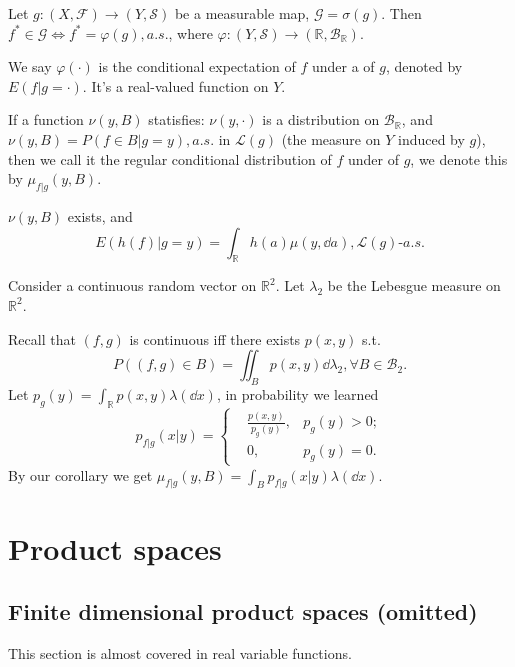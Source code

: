 Let $g:(X, \mathscr{F}) \to (Y, \mathscr{S})$ be a measurable map,
$\mathscr{G} = \sigma(g)$.
Then $f^*\in \mathscr{G} \iff f^* = \varphi(g), a.s.$,
where $\varphi:(Y, \mathscr{S}) \to (\mathbb{R}, \mathscr{B}_{\mathbb{R}})$.

\begin{definition}
	We say $\varphi(\cdot)$ is the conditional expectation of $f$ under
	a  of $g$, denoted by $E(f|g = \cdot)$.
	It's a real-valued function on $Y$.
\end{definition}
\begin{definition}
	If a function $\nu(y, B)$ statisfies:
	$\nu(y, \cdot)$ is a distribution on $\mathscr{B}_{\mathbb{R}}$,
	and $\nu(y, B) = P(f\in B| g = y), a.s.$ in $\mathscr{L}(g)$ (the measure on $Y$
	induced by $g$), then we call it the regular conditional distribution of $f$
	under  of $g$, we denote this by $\mu_{f|g}(y, B)$.
\end{definition}

\begin{corollary}
    $\nu(y, B)$ exists, and
	\[
	E(h(f)| g=y) = \int_{\mathbb{R}} h(a)\mu(y, \dd a), \mathscr{L}(g)\text{-}a.s.
	\]
\end{corollary}
\begin{example}
    Consider a continuous random vector on $\mathbb{R}^2$.
	Let $\lambda_2$ be the Lebesgue measure on $\mathbb{R}^2$.

	Recall that $(f, g)$ is continuous iff there exists $p(x, y)$ s.t.
	\[
	P((f,g)\in B) = \iint_{B} p(x, y)\dd \lambda_2, \forall B\in \mathscr{B}_2.
	\]
	Let $p_g(y) = \int_{\mathbb{R}} p(x, y)\lambda(\dd x)$,
	in probability we learned
	\[
	p_{f|g}(x|y) = \left\{
	\begin{aligned}
		&\frac{p(x, y)}{p_g(y)}, &p_g(y) > 0;\\
		&0, &p_g(y) = 0.
	\end{aligned}\right.
	\]
	By our corollary we get $\mu_{f|g}(y, B) = \int_Bp_{f|g}(x|y)\lambda(\dd x)$.
\end{example}

\section{Product spaces}
\label{sec:Product spaces}
\subsection{Finite dimensional product spaces (omitted)}
\label{sub:Finite dimensional product spaces}
This section is almost covered in real variable functions.

